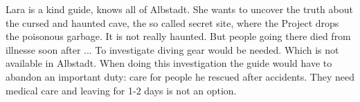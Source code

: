 \begin{npcBox}[title=Lara]
    \begin{consequences}
    \item {}
    \item {}
    \item {}
    \end{consequences}
    
    \begin{npcDescription}
    Lara is a kind guide, knows all of Albstadt. She wants to uncover the truth about the cursed and haunted cave, the so called secret site, where the Project drops the poisonous garbage. It is not really haunted. But people going there died from illnesse soon after ...
    To investigate diving gear would be needed. Which is not available in Albstadt.
    When doing this investigation the guide would have to abandon an important duty: care for people he rescued after accidents. They need medical care and leaving for 1-2 days is not an option.
    \end{npcDescription}
    
\end{npcBox}

